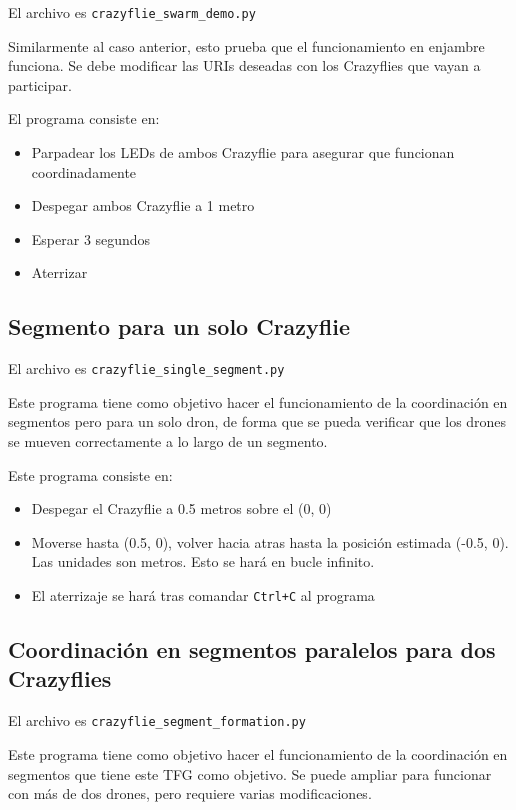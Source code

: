 El archivo es \texttt{crazyflie\_swarm\_demo.py}

Similarmente al caso anterior, esto prueba que el funcionamiento en enjambre funciona.
Se debe modificar las URIs deseadas con los Crazyflies que vayan a participar.

El programa consiste en:

\begin{itemize}
    \item Parpadear los LEDs de ambos Crazyflie para asegurar que funcionan coordinadamente
    \item Despegar ambos Crazyflie a 1 metro
    \item Esperar 3 segundos
    \item Aterrizar
\end{itemize}

\subsection{Segmento para un solo Crazyflie}

El archivo es \texttt{crazyflie\_single\_segment.py}

Este programa tiene como objetivo hacer el funcionamiento de la coordinación en segmentos
pero para un solo dron, de forma que se pueda verificar que los drones se mueven correctamente a lo largo de un segmento.

Este programa consiste en:

\begin{itemize}
    \item Despegar el Crazyflie a 0.5 metros sobre el (0, 0)
    \item Moverse hasta (0.5, 0), volver hacia atras hasta la posición estimada (-0.5, 0). Las unidades son metros. Esto se hará en bucle infinito.
    \item El aterrizaje se hará tras comandar \texttt{Ctrl+C} al programa
\end{itemize}

\subsection{Coordinación en segmentos paralelos para dos Crazyflies}

El archivo es \texttt{crazyflie\_segment\_formation.py}

Este programa tiene como objetivo hacer el funcionamiento de la coordinación en segmentos que tiene este TFG como objetivo.
Se puede ampliar para funcionar con más de dos drones, pero requiere varias modificaciones. 

